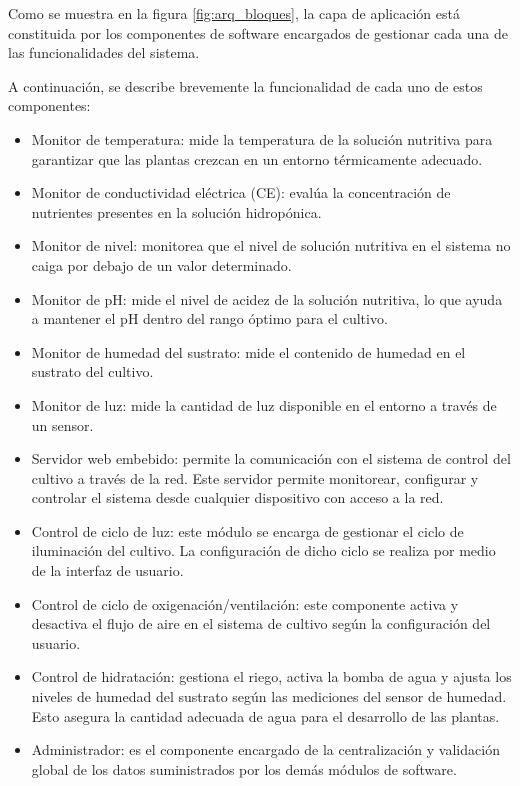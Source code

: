 Como se muestra en la figura \ref{fig:arq_bloques}, la capa de aplicación está constituida por los componentes de software encargados de gestionar cada una de las funcionalidades del sistema.

A continuación, se describe brevemente la funcionalidad de cada uno de estos componentes:

\begin{itemize}
	\item Monitor de temperatura: mide la temperatura de la solución nutritiva para garantizar que las plantas crezcan en un entorno térmicamente adecuado.
	\item Monitor de conductividad eléctrica (CE): evalúa la concentración de nutrientes presentes en la solución hidropónica.
	\item Monitor de nivel: monitorea que el nivel de solución nutritiva en el sistema no caiga por debajo de un valor determinado.
	\item Monitor de pH: mide el nivel de acidez de la solución nutritiva, lo que ayuda a mantener el pH dentro del rango óptimo para el cultivo.
	\item Monitor de humedad del sustrato: mide el contenido de humedad en el sustrato del cultivo.
	\item Monitor de luz: mide la cantidad de luz disponible en el entorno a través de un sensor.
	\item Servidor web embebido: permite la comunicación con el sistema de control del cultivo a través de la red. Este servidor permite monitorear, configurar y controlar el sistema desde cualquier dispositivo con acceso a la red.
	\item Control de ciclo de luz: este módulo se encarga de gestionar el ciclo de iluminación del cultivo. La configuración de dicho ciclo se realiza por medio de la interfaz de usuario.
	\item Control de ciclo de oxigenación/ventilación: este componente activa y desactiva el flujo de aire en el sistema de cultivo según la configuración del usuario.
	\item Control de hidratación: gestiona el riego, activa la bomba de agua y ajusta los niveles de humedad del sustrato según las mediciones del sensor de humedad. Esto asegura la cantidad adecuada de agua para el desarrollo de las plantas.
	\item Administrador: es el componente encargado de la centralización y validación global de los datos suministrados por los demás módulos de software.
\end{itemize}

